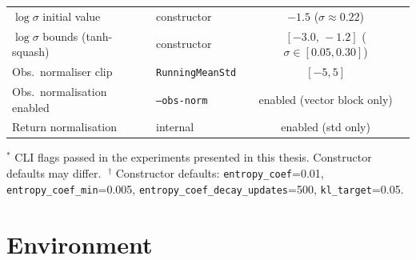 \begin{table}[H]
\begin{tabular}{@{}llc@{}}
    \(\log\sigma\) initial value   & constructor                  & \(-1.5\) (\(\sigma \approx 0.22\)) \\
    \(\log\sigma\) bounds (tanh-squash) & constructor             & \([-3.0,\, -1.2]\) (\(\sigma \in [0.05, 0.30]\)) \\
    Obs.\ normaliser clip          & \texttt{RunningMeanStd}      & \([-5, 5]\) \\
    Obs.\ normalisation enabled    & \texttt{--obs-norm}          & enabled (vector block only) \\
    Return normalisation           & internal                     & enabled (std only) \\
    \bottomrule
  \end{tabular}
  \vspace{2pt}
  \begin{minipage}{\linewidth}
    \footnotesize
    \(^*\) CLI flags passed in the experiments presented in this thesis. Constructor defaults
    may differ. \(\;^\dagger\) Constructor defaults: \texttt{entropy\_coef}=0.01,
    \texttt{entropy\_coef\_min}=0.005, \texttt{entropy\_coef\_decay\_updates}=500,
    \texttt{kl\_target}=0.05.
  \end{minipage}
\end{table}

\section{Environment}\label{app:hp-env}

